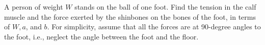 A person of weight $W$ stands on the ball of one foot.
Find the tension in the calf muscle and the force exerted by
the shinbones on the bones of the foot, in terms of $W,a$,
and $b$. For simplicity, assume that all the forces are at
90-degree angles to the foot, i.e., neglect the angle between
the foot and the floor.\answercheck
